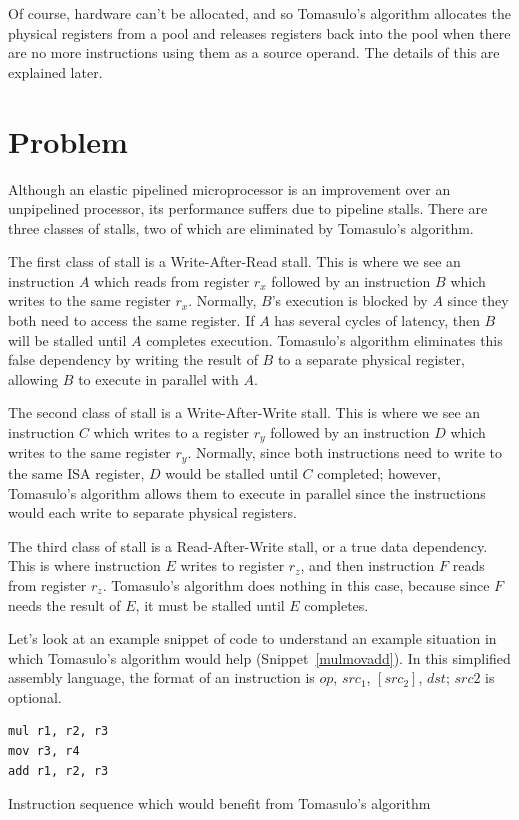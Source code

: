\documentclass[12pt]{article}
\begin{document}
Of course, hardware can't be allocated, and so Tomasulo's algorithm allocates
the physical registers from a pool and releases registers back into the pool
when there are no more instructions using them as a source operand. The
details of this are explained later.

\section{Problem\label{sec:problem}}
Although an elastic pipelined microprocessor is an improvement over an unpipelined processor, its performance suffers due to pipeline stalls.
There are three classes of stalls, two of which are eliminated by Tomasulo's algorithm.

The first class of stall is a Write-After-Read stall. This is where we see an
instruction $A$ which reads from register $r_x$ followed by an instruction $B$
which writes to the same register $r_x$. Normally, $B$'s execution is blocked
by $A$ since they both need to access the same register. If $A$ has several
cycles of latency, then $B$ will be stalled until $A$ completes execution.
Tomasulo's algorithm eliminates this false dependency by writing the result of
$B$ to a separate physical register, allowing $B$ to execute in parallel with
$A$.

The second class of stall is a Write-After-Write stall. This is where we see
an instruction $C$ which writes to a register $r_y$ followed by an instruction
$D$ which writes to the same register $r_y$. Normally, since both instructions
need to write to the same ISA register, $D$ would be stalled until $C$
completed; however, Tomasulo's algorithm allows them to execute in parallel
since the instructions would each write to separate physical registers.

The third class of stall is a Read-After-Write stall, or a true data
dependency. This is where instruction $E$ writes to register $r_z$, and then
instruction $F$ reads from register $r_z$. Tomasulo's algorithm does nothing
in this case, because since $F$ needs the result of $E$, it must be stalled
until $E$ completes.

Let's look at an example snippet of code to understand an example situation in
which Tomasulo's algorithm would help (Snippet~\ref{mulmovadd}). In this
simplified assembly language, the format of an instruction is $op$, $src_1$,
$\left[src_2\right]$, $dst$; $src2$ is optional.

\begin{snippet}
\begin{verbatim}
mul r1, r2, r3
mov r3, r4
add r1, r2, r3
\end{verbatim}
\caption{Instruction sequence which would benefit from Tomasulo's algorithm}
\label{mulmovadd}
\end{snippet}
\end{document}
